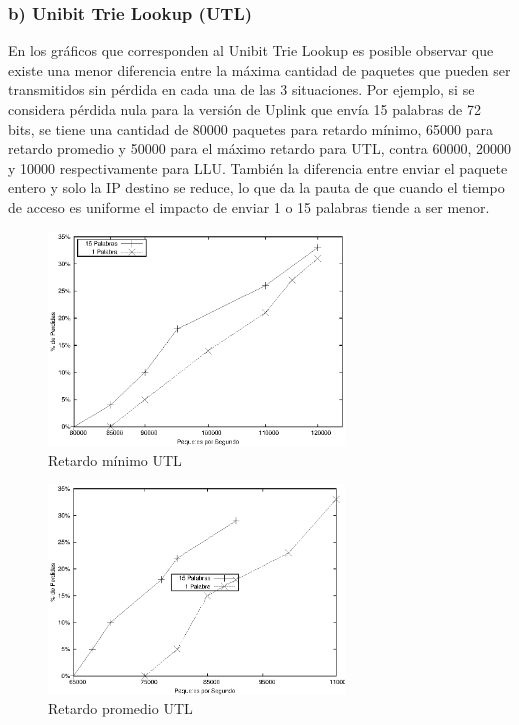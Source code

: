 \newpage
\subsubsection{b) Unibit Trie Lookup (UTL) }

En los gráficos que corresponden al Unibit Trie Lookup es posible observar que existe una menor diferencia entre la máxima cantidad de paquetes que pueden ser transmitidos sin pérdida en cada una de las 3 situaciones. Por ejemplo, si se considera pérdida nula para la versión de Uplink que envía 15 palabras de 72 bits, se tiene una cantidad de 80000 paquetes para retardo mínimo, 65000 para retardo promedio y 50000 para el máximo retardo para UTL, contra 60000, 20000 y 10000 respectivamente para LLU. También la diferencia entre enviar el paquete entero y solo la IP destino se reduce, lo que da la pauta de que cuando el tiempo de acceso es uniforme el impacto de enviar 1 o 15 palabras tiende a ser menor.
\begin{figure}[!h]
  \centering
	\includegraphics[width=0.7\textwidth]{5-resultados/graf/utlmin.eps}
  \caption{Retardo mínimo UTL}
  \label{fig}
\end{figure}
\begin{figure}[!h]
  \centering
	\includegraphics[width=0.7\textwidth]{5-resultados/graf/utlprom.eps}
  \caption{Retardo promedio UTL}
  \label{fig}
\end{figure}
